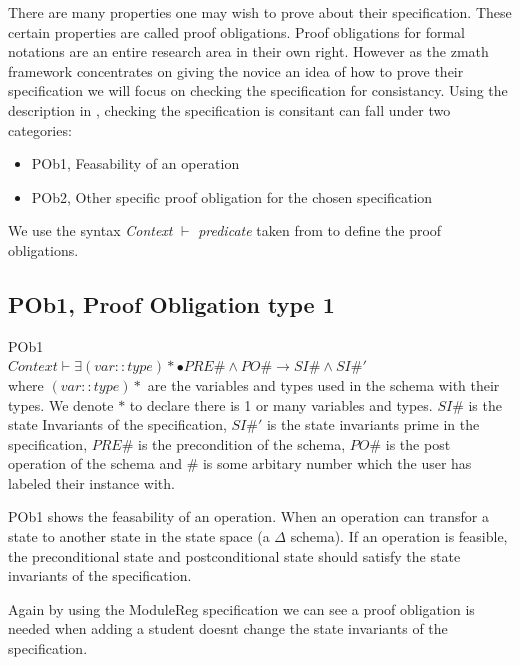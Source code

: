 There are many properties one may wish to prove about their specification. These certain properties are called proof obligations. Proof obligations for formal notations are an entire research area in their own right. However as the \gls{zmath} framework concentrates on giving the novice an idea of how to prove their specification we will focus on checking the specification for consistancy. Using the description in \cite{DBLP:conf/icsea/WenMZ06}, checking the specification is consitant can fall under two categories:

\begin{itemize}
\item POb1, Feasability of an operation
\item POb2, Other specific proof obligation for the chosen specification
\end{itemize}

We use the syntax \textit{Context} $\vdash$ \textit{predicate} taken from \cite{DBLP:conf/icsea/WenMZ06} to define the proof obligations.

\subsection{POb1, Proof Obligation type 1}

\begin{defin}\label{defa}POb1\\

$Context \vdash \exists (var::type)* \bullet PRE\# \land PO\# \longrightarrow SI\# \land SI\#'$\\

\noindent where $(var::type)*$ are the variables and types used in the schema with their types. We denote $*$ to declare there is 1 or many variables and types. $SI\#$ is the state Invariants of the specification, $SI\#'$ is the state invariants prime in the specification, $PRE\#$ is the precondition of the schema, $PO\#$ is the post operation of the schema and $\#$ is some arbitary number which the user has labeled their instance with.
\end{defin}

POb1 shows the feasability of an operation. When an operation can transfor a state to another state in the state space (a $\Delta$ schema). If an operation is feasible, the preconditional state and postconditional state should satisfy the state invariants of the specification.

Again by using the ModuleReg specification we can see a proof obligation is needed when adding a student doesnt change the state invariants of the specification.

